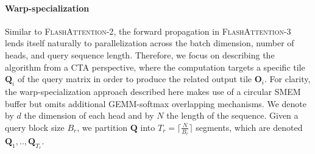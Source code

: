\paragraph{Warp-specialization}  
Similar to \textsc{FlashAttention-2}, the forward propagation in \textsc{FlashAttention-3} lends itself naturally to parallelization across the batch dimension, number of heads, and query sequence length. Therefore, we focus on describing the algorithm from a CTA perspective, where the computation targets a specific tile $\mathbf{Q}_i$ of the query matrix in order to produce the related output tile $\mathbf{O}_i$. For clarity, the warp-specialization approach described here makes use of a circular SMEM buffer but omits additional GEMM-softmax overlapping mechanisms. We denote by $d$ the dimension of each head and by $N$ the length of the sequence. Given a query block size $B_r$, we partition $\mathbf{Q}$ into $T_r = \lceil \frac{N}{B_r} \rceil$ segments, which are denoted $\mathbf{Q}_1, .., \mathbf{Q}_{T_r}$.

